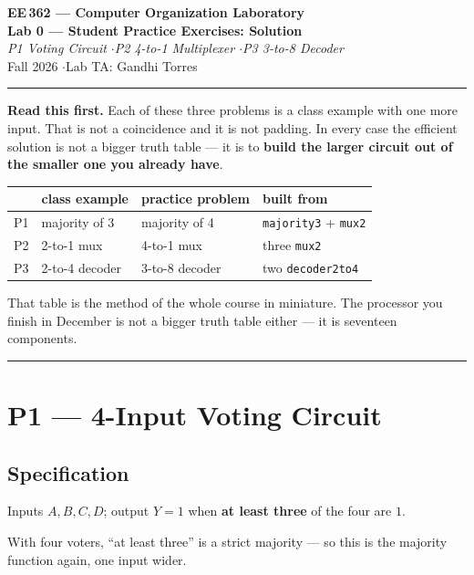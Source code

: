 \documentclass[11pt]{article}
\newcommand{\code}[1]{\texttt{#1}}
\newcommand{\hr}{\vspace{2pt}\hrule\vspace{6pt}}
\begin{document}
\begin{center}
{\Large\bfseries EE\,362 --- Computer Organization Laboratory}\\[2pt]
{\large\bfseries Lab 0 --- Student Practice Exercises: Solution}\\[2pt]
{\itshape P1 Voting Circuit \quad$\cdot$\quad P2 4-to-1 Multiplexer \quad$\cdot$\quad P3 3-to-8 Decoder}\\[4pt]
Fall 2026 \quad$\cdot$\quad Lab TA: Gandhi Torres
\end{center}
\hr

\textbf{Read this first.} Each of these three problems is a class example with one
more input. That is not a coincidence and it is not padding. In every case the
efficient solution is not a bigger truth table --- it is to \textbf{build the larger
circuit out of the smaller one you already have}.

\begin{center}
\begin{tabular}{llll}
\toprule
& class example & practice problem & built from \\
\midrule
P1 & majority of 3 & majority of 4 & \code{majority3} + \code{mux2} \\
P2 & 2-to-1 mux & 4-to-1 mux & three \code{mux2} \\
P3 & 2-to-4 decoder & 3-to-8 decoder & two \code{decoder2to4} \\
\bottomrule
\end{tabular}
\end{center}

That table is the method of the whole course in miniature. The processor you finish
in December is not a bigger truth table either --- it is seventeen components.

\vspace{4pt}\hr

\section*{P1 --- 4-Input Voting Circuit}

\subsection*{Specification}

Inputs $A,B,C,D$; output $Y = 1$ when \textbf{at least three} of the four are $1$.

With four voters, ``at least three'' is a strict majority --- so this is the
majority function again, one input wider.
\end{document}
